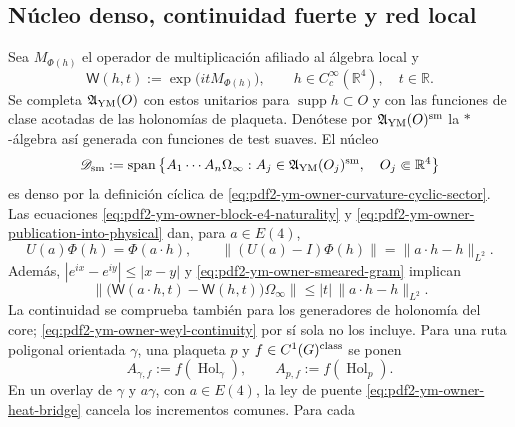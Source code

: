 \subsection{Núcleo denso, continuidad fuerte y red local}

Sea $M_{\Phi(h)}$ el operador de multiplicación afiliado al álgebra local y
\begin{equation}\label{eq:pdf2-ym-owner-curvature-weyl}
 \mathsf W(h,t):=\exp\!\bigl(itM_{\Phi(h)}\bigr),
 \qquad h\in C_c^\infty(\mathbb R^4),\quad t\in\mathbb R.
\end{equation}
Se completa $\mathfrak A_{\rm YM}(O)$ con estos unitarios para
$\operatorname{supp}h\subset O$ y con las funciones de clase acotadas de las
holonomías de plaqueta. Denótese por $\mathfrak A_{\rm YM}(O)^{\rm sm}$ la
$*$-álgebra así generada con funciones de test suaves. El núcleo
\begin{equation}\label{eq:pdf2-ym-owner-smooth-core}
 \mathscr D_{\rm sm}:=\operatorname{span}\left\{
 A_1\cdots A_n\Omega_\infty:
 A_j\in\mathfrak A_{\rm YM}(O_j)^{\rm sm},\quad
 O_j\Subset\mathbb R^4\right\}
\end{equation}
es denso por la definición cíclica de
\eqref{eq:pdf2-ym-owner-curvature-cyclic-sector}. Las ecuaciones
\eqref{eq:pdf2-ym-owner-block-e4-naturality} y
\eqref{eq:pdf2-ym-owner-publication-into-physical} dan, para $a\in E(4)$,
\begin{equation}\label{eq:pdf2-ym-owner-field-e4-covariance}
 U(a)\Phi(h)=\Phi(a\!\cdot h),
 \qquad
 \|(U(a)-I)\Phi(h)\|=\|a\!\cdot h-h\|_{L^2}.
\end{equation}
Además, $|e^{ix}-e^{iy}|\le|x-y|$ y
\eqref{eq:pdf2-ym-owner-smeared-gram} implican
\begin{equation}\label{eq:pdf2-ym-owner-weyl-continuity}
 \|\bigl(\mathsf W(a\!\cdot h,t)-\mathsf W(h,t)\bigr)\Omega_\infty\|
 \le |t|\,\|a\!\cdot h-h\|_{L^2}.
\end{equation}
La continuidad se comprueba también para los generadores de holonomía del core;
\eqref{eq:pdf2-ym-owner-weyl-continuity} por sí sola no los incluye. Para una ruta poligonal orientada $\gamma$,
una plaqueta $p$ y $f\in C^1(G)^{\rm class}$ se ponen
\begin{equation}\label{eq:pdf2-ym-owner-holonomy-core-generators}
 A_{\gamma,f}:=f(\operatorname{Hol}_\gamma),
 \qquad A_{p,f}:=f(\operatorname{Hol}_p).
\end{equation}
En un overlay de $\gamma$ y $a\gamma$, con $a\in E(4)$, la ley de puente
\eqref{eq:pdf2-ym-owner-heat-bridge} cancela los incrementos comunes. Para cada
